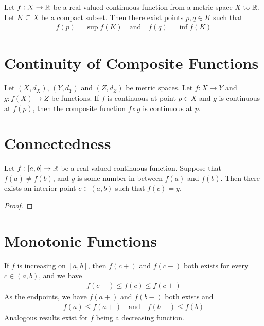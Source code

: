 \documentclass[thmcnt=section, 12pt]{my-elegantbook}
\begin{document}

\begin{theorem} \label{thm:6}
    Let $f: X \to \mathbb{R}$ be a real-valued continuous function from a metric space $X$ to $\mathbb{R}$. Let $K \subseteq X$ be a compact subset. Then there exist points $p, q \in K$ such that 
    \begin{align*}
        f(p) = \sup f(K)
        \quad \text{and} \quad
        f(q) = \inf f(K)
    \end{align*}
\end{theorem}


\section{Continuity of Composite Functions}

\begin{theorem} \label{thm:41}
    Let $(X, d_X)$, $(Y, d_Y)$ and $(Z, d_Z)$ be metric spaces. Let $f: X \to Y$ and $g: f(X) \to Z$ be functions. If $f$ is continuous at point $p \in X$ and $g$ is continuous at $f(p)$, then the composite function $f \circ g$ is continuous at $p$.
\end{theorem}


\section{Connectedness}

\begin{theorem} \label{thm:11}
    Let $f: [a, b] \to \mathbb{R}$ be a real-valued continuous function. Suppose that $f(a) \neq f(b)$, and $y$ is some number in between $f(a)$ and $f(b)$. Then there exists an interior point $c \in (a, b)$ such that $f(c) = y$.
\end{theorem}

\begin{proof}
\end{proof}


\section{Monotonic Functions}

\begin{theorem} \label{thm:15}
    If $f$ is increasing on $[a, b]$, then $f(c+)$ and $f(c-)$ both exists for every $c \in (a, b)$, and we have
    \begin{align*}
        f(c-) \leq f(c) \leq f(c+) 
    \end{align*}
    As the endpoints, we have $f(a+)$ and $f(b-)$ both exists and 
    \begin{align}
        f(a) \leq f(a+)
        \quad \text{and} \quad 
        f(b-) \leq f(b)
        \label{eq:18}
    \end{align}
    Analogous results exist for $f$ being a decreasing function.
\end{theorem}
\end{document}
